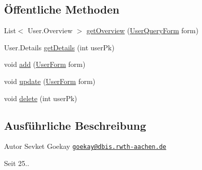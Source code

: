 \subsection*{Öffentliche Methoden}
\begin{DoxyCompactItemize}
\item 
List$<$ User.\-Overview $>$ \hyperlink{classde_1_1rwth_1_1idsg_1_1steve_1_1repository_1_1impl_1_1_user_repository_impl_ac3ecc6e753534fdf092a492c692cb71e}{get\-Overview} (\hyperlink{classde_1_1rwth_1_1idsg_1_1steve_1_1web_1_1dto_1_1_user_query_form}{User\-Query\-Form} form)
\item 
User.\-Details \hyperlink{classde_1_1rwth_1_1idsg_1_1steve_1_1repository_1_1impl_1_1_user_repository_impl_aaad9fca25e2258f7913925814fd2917b}{get\-Details} (int user\-Pk)
\item 
void \hyperlink{classde_1_1rwth_1_1idsg_1_1steve_1_1repository_1_1impl_1_1_user_repository_impl_aa16fc4e4079585612b8bf668c7a5f32a}{add} (\hyperlink{classde_1_1rwth_1_1idsg_1_1steve_1_1web_1_1dto_1_1_user_form}{User\-Form} form)
\item 
void \hyperlink{classde_1_1rwth_1_1idsg_1_1steve_1_1repository_1_1impl_1_1_user_repository_impl_a3b0b8f105df28fd92c342aed64487920}{update} (\hyperlink{classde_1_1rwth_1_1idsg_1_1steve_1_1web_1_1dto_1_1_user_form}{User\-Form} form)
\item 
void \hyperlink{classde_1_1rwth_1_1idsg_1_1steve_1_1repository_1_1impl_1_1_user_repository_impl_af6ac78abc5a260261d071e2177e099aa}{delete} (int user\-Pk)
\end{DoxyCompactItemize}


\subsection{Ausführliche Beschreibung}
\begin{DoxyAuthor}{Autor}
Sevket Goekay \href{mailto:goekay@dbis.rwth-aachen.de}{\tt goekay@dbis.\-rwth-\/aachen.\-de} 
\end{DoxyAuthor}
\begin{DoxySince}{Seit}
25.. 
\end{DoxySince}


